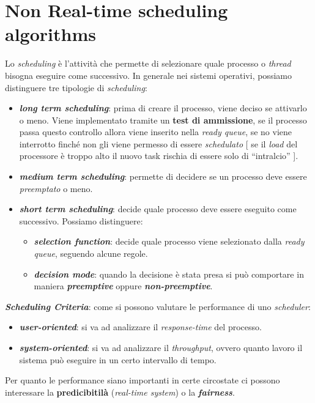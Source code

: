 \chapter{Non Real-time scheduling algorithms}
Lo \textit{scheduling} è l'attività che permette di selezionare quale processo o \textit{thread} bisogna eseguire come successivo. In generale nei sistemi operativi, possiamo distinguere tre tipologie di \textit{scheduling}:
\begin{itemize}
    \item \textbf{\textit{long term scheduling}}: prima di creare il processo, viene deciso se attivarlo o meno. Viene implementato tramite un \textbf{test di ammissione}, se il processo passa questo controllo allora viene inserito nella \textit{ready queue}, se no viene interrotto finché non gli viene permesso di essere \textit{schedulato} [ se il \textit{load} del processore è troppo alto il nuovo task rischia di essere solo di ``intralcio'' ].
    \item \textbf{\textit{medium term scheduling}}: permette di decidere se un processo deve essere \textit{preemptato} o meno.
    \item \textbf{\textit{short term scheduling}}: decide quale processo deve essere eseguito come successivo. Possiamo distinguere:
    \begin{itemize}
        \item \textbf{\textit{selection function}}: decide quale processo viene selezionato dalla \textit{ready queue}, seguendo alcune regole.
        \item \textbf{\textit{decision mode}}: quando la decisione è stata presa si può comportare in maniera \textbf{\textit{preemptive}} oppure \textbf{\textit{non-preemptive}}.
    \end{itemize}
\end{itemize}
\textbf{\textit{Scheduling Criteria}}: come si possono valutare le performance di uno \textit{scheduler}:
\begin{itemize}
    \item \textbf{\textit{user-oriented}}: si va ad analizzare il \textit{response-time} del processo.
    \item \textbf{\textit{system-oriented}}: si va ad analizzare il \textit{throughput}, ovvero quanto lavoro il sistema può eseguire in un certo intervallo di tempo.
\end{itemize}
Per quanto le performance siano importanti in certe circostate ci possono interessare la \textbf{predicibitilà} (\textit{real-time system}) o la \textbf{\textit{fairness}}. \\
